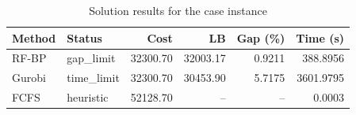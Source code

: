 \begin{table}[htbp]
\centering\small
\caption{Solution results for the case instance}
\label{tab:case-methods}
\begin{tabular}{llrrrr}
\toprule
Method & Status & Cost & LB & Gap (\%) & Time (s) \\
\midrule
RF-BP & gap\_limit & 32300.70 & 32003.17 & 0.9211 & 388.8956 \\
Gurobi & time\_limit & 32300.70 & 30453.90 & 5.7175 & 3601.9795 \\
FCFS & heuristic & 52128.70 & -- & -- & 0.0003 \\
\bottomrule
\end{tabular}
\end{table}